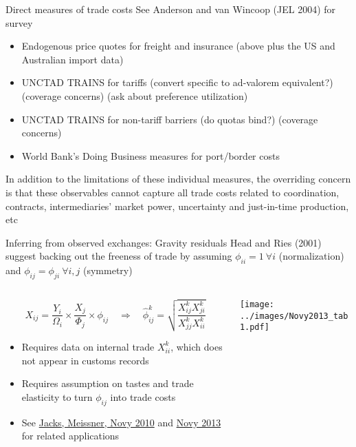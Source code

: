 \documentclass[10pt,notes=hide,aspectratio=169]{beamer}
\begin{document}
\begin{frame}{Direct measures of trade costs}
See Anderson and van Wincoop (JEL 2004) for survey
\begin{itemize}
	\item Endogenous price quotes for freight and insurance (above plus the US and Australian import data)
	\item UNCTAD TRAINS for tariffs (convert specific to ad-valorem equivalent?) (coverage concerns) (ask about preference utilization)
	\item UNCTAD TRAINS for non-tariff barriers (do quotas bind?) (coverage concerns)
	\item World Bank's Doing Business measures for port/border costs
\end{itemize}
In addition to the limitations of these individual measures,
the overriding concern is that these observables cannot capture all trade costs related to coordination, contracts, intermediaries' market power, uncertainty and just-in-time production, etc
\end{frame}
\begin{frame}{Inferring from observed exchanges: Gravity residuals}
Head and Ries (2001) suggest backing out the freeness of trade by assuming
$\phi_{ii}=1 \ \forall i$ (normalization) and $\phi_{ij}=\phi_{ji} \ \forall i,j$ (symmetry)
\begin{columns}
\begin{column}{.52\textwidth}
\begin{equation*}
X_{ij} = {\frac{Y_i}{\Omega_i}} \times {\frac{X_j}{\Phi_j}} \times \phi_{ij}
\quad \Rightarrow \quad
\hat{\phi}^k_{ij}=\sqrt{\frac{X^k_{ij}X^k_{ji}}{X^k_{jj}X^k_{ii}}}
\end{equation*}
\begin{itemize}
	\item Requires data on internal trade $X_{ii}^k$, which does not appear in customs records
	\item Requires assumption on tastes and trade elasticity to turn $\phi_{ij}$ into trade costs
	\item See \href{https://doi.org/10.1016/j.eeh.2009.07.001}{Jacks, Meissner, Novy 2010} and \href{https://doi.org/10.1111/j.1465-7295.2011.00439.x}{Novy 2013} for related applications
\end{itemize}
\end{column}
\begin{column}{.45\textwidth}
\texttt{[image: ../images/Novy2013\_tab1.pdf]}
\end{column}
\end{columns}
\end{frame}
\end{document}
